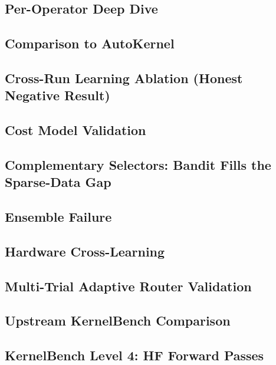 \documentclass{article}
\begin{document}
\subsection{Per-Operator Deep Dive}
\label{sec:per-operator}

\subsection{Comparison to AutoKernel}
\label{sec:autokernel}

\subsection{Cross-Run Learning Ablation (Honest Negative Result)}
\label{sec:cross-run-ablation}

\subsection{Cost Model Validation}
\label{sec:cost-model-validation}

\subsection{Complementary Selectors: Bandit Fills the Sparse-Data Gap}
\label{sec:selectors}

\subsection{Ensemble Failure}
\label{sec:ensemble-failure}

\subsection{Hardware Cross-Learning}
\label{sec:hw-cross-learning}

\subsection{Multi-Trial Adaptive Router Validation}
\label{sec:adaptive-router}

\subsection{Upstream KernelBench Comparison}
\label{sec:kernelbench}

\subsection{KernelBench Level 4: HF Forward Passes}
\label{sec:kb-level4}
\end{document}
